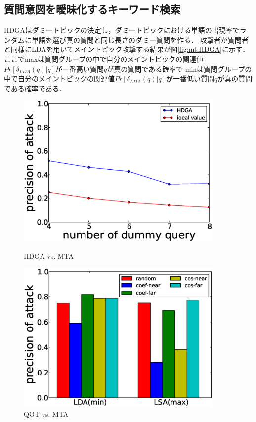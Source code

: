 \documentclass[master]{suribt}
\theoremstyle{definition}
\begin{document}
 \subsection{質問意図を曖昧化するキーワード検索}
 HDGAはダミートピックの決定し，ダミートピックにおける単語の出現率でランダムに単語を選び真の質問と同じ長さのダミー質問を作る．
 攻撃者が質問者と同様にLDAを用いてメイントピック攻撃する結果が図\ref{fig:mt:HDGA}に示す．
 ここでmaxは質問グループの中で自分のメイントピックの関連値$Pr[\delta_{LDA}(q)|q]$が一番高い質問$q$が真の質問である確率で
 minは質問グループの中で自分のメイントピックの関連値$Pr[\delta_{LDA}(q)|q]$が一番低い質問$q$が真の質問である確率である．
 
 \begin{figure}
 \begin{minipage}[t]{0.5\linewidth}
 \centering
 \includegraphics[width=0.9\textwidth]{HMD.eps}
 \vspace{5em}
 \caption{HDGA vs. MTA}
 \label{fig:mt:HDGA}
 \end{minipage}%
 \begin{minipage}[t]{0.5\linewidth}
 \centering
 \includegraphics[width=0.9\textwidth]{AAAA1.eps}
 \vspace{5em}
 \caption{QOT vs. MTA}
 \label{fig:mt:AAAA}
 \end{minipage}
 \end{figure}
\end{document}
